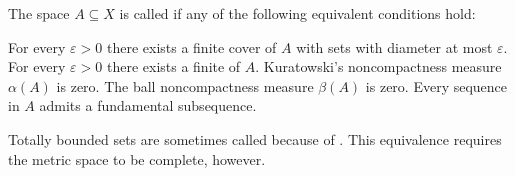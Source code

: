 \begin{definition}\label{def:totally_bounded_set}
  The space \( A \subseteq X \) is called  if any of the following equivalent conditions hold:

  \begin{defenum}
     For every \( \varepsilon > 0 \) there exists a finite cover of \( A \) with sets with diameter at most \( \varepsilon \).
     For every \( \varepsilon > 0 \) there exists a finite  of \( A \).
     Kuratowski's noncompactness measure \( \alpha(A) \) is zero.
     The ball noncompactness measure \( \beta(A) \) is zero.
     Every sequence in \( A \) admits a fundamental subsequence.
  \end{defenum}

  Totally bounded sets are sometimes called  because of . This equivalence requires the metric space to be complete, however.
\end{definition}
